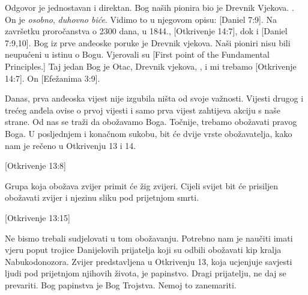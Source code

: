 Odgovor je jednostavan i direktan. Bog naših pionira bio je Drevnik Vjekova. . On je \textit{osobno}, \textit{duhovno biće}. Vidimo to u njegovom opisu: [Daniel 7:9]. Na završetku proročanstva o 2300 dana, u 1844., [Otkrivenje 14:7], dok  i [Daniel 7:9,10]. Bog iz prve anđeoske poruke je Drevnik vjekova. Naši pioniri nisu bili neupućeni u istinu o Bogu. Vjerovali su [First point of the Fundamental Principles.] Taj jedan Bog je Otac, Drevnik vjekova, , i mi trebamo [Otkrivenje 14:7]. On [Efežanima 3:9].

Danas, prva anđeoska vijest nije izgubila ništa od svoje važnosti. Vijesti drugog i trećeg anđela ovise o prvoj vijesti i samo prva vijest zahtijeva akciju s naše strane. Od nas se traži da obožavamo Boga. Točnije, trebamo obožavati pravog Boga. U posljednjem i konačnom sukobu, bit će dvije vrste obožavatelja, kako nam je rečeno u Otkrivenju 13 i 14.

[Otkrivenje 13:8]

Grupa koja obožava zvijer primit će žig zvijeri. Cijeli svijet bit će prisiljen obožavati zvijer i njezinu sliku pod prijetnjom smrti.

[Otkrivenje 13:15]

Ne bismo trebali sudjelovati u tom obožavanju. Potrebno nam je naučiti imati vjeru poput trojice Danijelovih prijatelja koji su odbili obožavati kip kralja Nabukodonozora. Zvijer predstavljena u Otkrivenju 13, koja ucjenjuje savjesti ljudi pod prijetnjom njihovih života, je papinstvo. Dragi prijatelju, ne daj se prevariti. Bog papinstva je Bog Trojstva. Nemoj to zanemariti.


